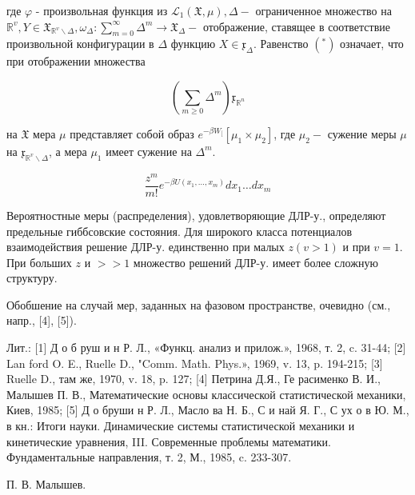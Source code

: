 \documentclass[10pt]{article}
\begin{document}
где $\varphi$ - произвольная функция из $\mathscr{L}_{1}(\mathfrak{X}, \mu), \Delta-$ ограниченное множество на $\mathbb{R}^{v}, Y \in \mathfrak{X}_{\mathbb{R}^{v} \backslash \Delta}, \omega_{\Delta}: \sum_{m=0}^{\infty} \Delta^{m} \rightarrow \mathfrak{X}_{\Delta}-$ отображение, ставящее в соответствие произвольной конфигурации в $\Delta$ функцию $X \in \mathfrak{x}_{\Delta}$. Равенство $\left({ }^{*}\right)$ означает, что при отображении множества



\[

\left(\sum_{m \geqslant 0} \Delta^{m}\right) \mathfrak{x}_{\mathbb{R}^{n}}

\]



на $\mathfrak{X}$ мера $\mu$ представляет собой образ $e^{-\beta W_{[}}\left[\mu_{1} \times \mu_{2}\right]$, где $\mu_{2}-$ сужение меры $\mu$ на $\mathfrak{x}_{\mathbb{R}^{v} \backslash \Delta}$, а мера $\mu_{1}$ имеет сужение на $\Delta^{m}$.



\[

\frac{z^{m}}{m !} e^{-\beta U\left(x_{1}, \ldots, x_{m}\right)} d x_{1} \ldots d x_{m}

\]



Вероятностные меры (распределения), удовлетворяющие ДЛР-у., определяют предельные гиббсовские состояния. Для широкого класса потенциалов взаимодействия решение ДЛР-у. единственно при малых $z(v>1)$ и при $v=1$. При больших $z$ и $>>1$ множество решений ДЛР-у. имеет более сложную структуру.



Обобшение на случай мер, заданных на фазовом пространстве, очевидно (см., напр., [4], [5]).



Лит.: [1] Д о б руш и н Р. Л., «Функц. анализ и прилож.», 1968, т. 2, c. 31-44; [2] Lan ford O. E., Ruelle D., "Comm. Math. Phys.», 1969, v. 13, p. 194-215; [3] Ruelle D., там же, 1970, v. 18, p. 127; [4] Петрина Д.Я., Ге расименко В. И., Малышев П. В., Математические основы классической статистической механики, Киев, 1985; [5] Д о бруши н Р. Л., Масло ва Н. Б., С и най Я. Г., С ух о в Ю. М., в кн.: Итоги науки. Динамические системы статистической механики и кинетические уравнения, III. Современные проблемы математики. Фундаментальные направления, т. 2, М., 1985, c. 233-307.



П. В. Малышев.
\end{document}

